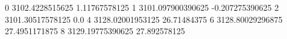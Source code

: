 0 3102.4228515625 1.11767578125
1 3101.097900390625 -0.207275390625
2 3101.30517578125 0.0
4 3128.02001953125 26.71484375
6 3128.80029296875 27.4951171875
8 3129.19775390625 27.892578125
